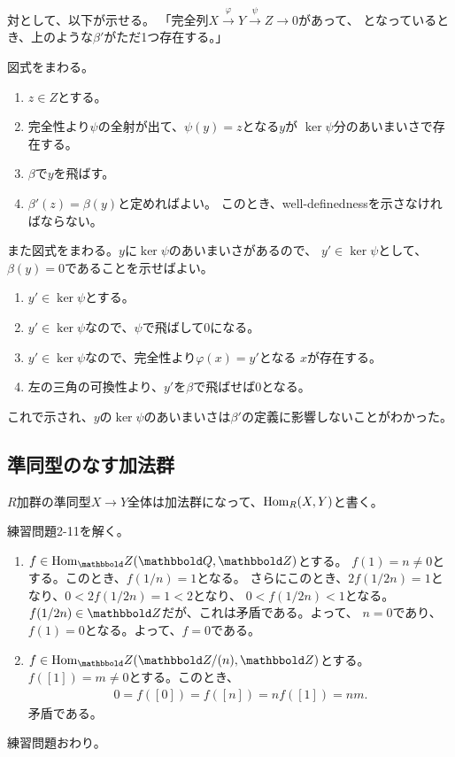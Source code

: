 \documentclass[9pt]{ltjsarticle}
\def\MARU#1{\textcircled{\scriptsize #1}}
\begin{document}
対として、以下が示せる。
「完全列$X \xrightarrow{\varphi} Y \xrightarrow{\psi} Z \to 0$があって、
となっているとき、上のような$\beta'$がただ1つ存在する。」
\begin{myproof}
  図式をまわる。
  \begin{enumerate}[label=\MARU{\arabic*}]
    \item $z\in Z$とする。
    \item 完全性より$\psi$の全射が出て、$\psi(y)=z$となる$y$が
    $\ker \psi$分のあいまいさで存在する。
    \item $\beta$で$y$を飛ばす。
    \item $\beta'(z)=\beta(y)$と定めればよい。
    このとき、well-definednessを示さなければならない。
  \end{enumerate}
  また図式をまわる。$y$に$\ker \psi$のあいまいさがあるので、
  $y'\in \ker \psi$として、$\beta(y)=0$であることを示せばよい。
  \begin{enumerate}[label=\MARU{\arabic*}]
    \item $y' \in \ker \psi$とする。
    \item $y' \in \ker \psi$なので、$\psi$で飛ばして0になる。
    \item $y' \in \ker \psi$なので、完全性より$\varphi(x)=y'$となる
    $x$が存在する。
    \item 左の三角の可換性より、$y'$を$\beta$で飛ばせば$0$となる。
  \end{enumerate}
  これで示され、$y$の$\ker \psi$のあいまいさは$\beta'$の定義に影響しないことがわかった。
\end{myproof}

\subsection{準同型のなす加法群}
\label{sub:準同型のなす加法群}
$R$加群の準同型$X\to Y$全体は加法群になって、$\mathrm{Hom}_R(X,Y)$と書く。

練習問題2-11を解く。
\begin{enumerate}[label=(\arabic*)]
  \item $f\in \Hom_\Z(\Q,\Z)$とする。
  $f(1)=n \neq 0$とする。このとき、$f(1/n)=1$となる。
  さらにこのとき、$2f(1/2n)=1$となり、$0<2f(1/2n)=1 < 2$となり、
  $0<f(1/2n)<1$となる。$f(1/2n)\in \Z$だが、これは矛盾である。よって、
  $n=0$であり、$f(1)=0$となる。よって、$f=0$である。
  \item $f\in \Hom_\Z(\Z/(n),\Z)$とする。
  $f([1])=m \neq 0$とする。このとき、
  \begin{align}
    0=f([0]) = f([n]) = nf([1]) = nm.
  \end{align}
  矛盾である。
\end{enumerate}
練習問題おわり。
\end{document}
